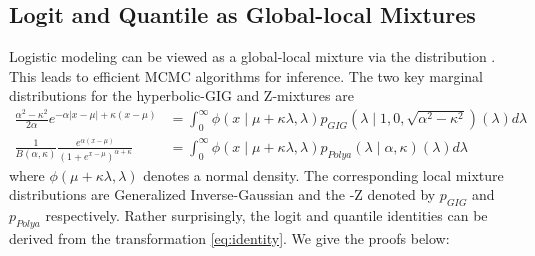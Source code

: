 \documentclass[letterpaper,11pt]{article}
\begin{document}
\subsection{Logit and Quantile as Global-local Mixtures}
Logistic modeling can be viewed as a global-local mixture via the \PG distribution \citep{polson2013bayesian}. This leads to efficient MCMC algorithms for inference. The two key marginal distributions for the hyperbolic-GIG \citep{barndorff1977infinite} and Z-\Polya mixtures \citep{polson2013bayesian,barndorff1982normal} are 
\begin{align}
\frac{\alpha^2-\kappa^2}{2\alpha} e^{-\alpha|x-\mu| + \kappa(x-\mu)} & = \int_0^{\infty} \phi(x \mid \mu + \kappa \lambda, \lambda) p_{GIG}(\lambda \mid 1,0,\sqrt{\alpha^2-\kappa^2}) (\lambda)  d\lambda \label{eq:GIG}\\
\frac{1}{B(\alpha,\kappa)} \frac{e^{\alpha(x-\mu)}}{(1+e^{x-\mu})^{\alpha + \kappa}} & = \int_0^{\infty} \phi( x \mid \mu + \kappa \lambda, \lambda) p_{Polya}(\lambda \mid \alpha,\kappa) (\lambda) d\lambda \label{eq:polya}
\end{align}
where $\phi(\mu + \kappa \lambda, \lambda)$ denotes a normal density. The corresponding local mixture distributions are Generalized Inverse-Gaussian and the \Polya-Z denoted by $p_{GIG}$ and $p_{Polya}$ respectively. Rather surprisingly, the logit and quantile identities can be derived from the \CS transformation \eqref{eq:identity}. We give the proofs below: 
\end{document}
